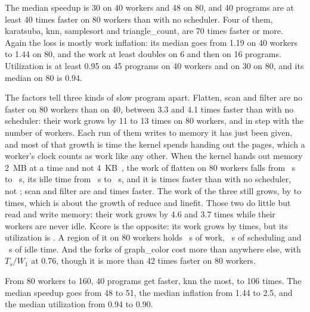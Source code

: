\documentclass[sigplan,nonacm]{acmart}
\begin{document}
The median speedup is 30 on 40 workers and 48 on 80, and 40 programs
are at least 40 times faster on 80 workers than with no scheduler.
%
Four of them, karatsuba, knn, samplesort and triangle\_count, are 70
times faster or more.
%
Again the loss is mostly work inflation: its median goes from 1.19 on
40 workers to 1.44 on 80, and the work at least doubles on 6 and then
on 16 programs.
%
Utilization is at least 0.95 on 45 programs on 40 workers and on 30 on
80, and its median on 80 is 0.94.

The factors tell three kinds of slow program apart.
%
Flatten, scan and filter are no faster on 80 workers than on 40,
between 3.3 and 4.1 times faster than with no scheduler: their work grows by 11 to 13
times on 80 workers, and in step with the number of workers.
%
Each run of them writes to memory it has just been given, and most of
that growth is time the kernel spends handing out the pages, which a
worker's clock counts as work like any other.
%
When the kernel hands out memory 2~MB at a time and not
4~KB~\cite{flexibench-thpicelake}, the work of flatten on 80 workers
falls from ~s to
~s, its idle time from
~s to
~s, and it is
 times faster than with no
scheduler, not ; scan and
filter are  and
 times faster.
%
The work of the three still grows, by
 to
 times, which is about the growth
of reduce and linefit.
%
Those two do little but read and write memory: their work
grows by 4.6 and 3.7 times while their workers are never idle.
%
Kcore is the opposite: its work grows by
 times, but its utilization
is .
%
A region of it on 80 workers holds
~s of work,
~s of scheduling and
~s of idle time.
%
And the forks of graph\_color cost more than anywhere else, with
$T_s/W_1$ at 0.76, though it is more than 42 times faster on 80 workers.

From 80 workers to 160, 40 programs get faster, knn the most, to 106
times.
%
The median speedup goes from 48 to 51, the median inflation from 1.44
to 2.5, and the median utilization from 0.94 to 0.90.
\end{document}
